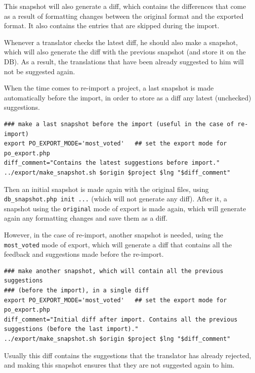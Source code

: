 \documentclass[11pt]{article}
\begin{document}
\begin{itemize}
     This snapshot will also generate a diff, which contains the
     differences that come as a result of formatting changes between the
     original format and the exported format. It also contains the
     entries that are skipped during the import.

     Whenever a translator checks the latest diff, he should also make a
     snapshot, which will also generate the diff with the previous
     snapshot (and store it on the DB). As a result, the translations
     that have been already suggested to him will not be suggested
     again.

     When the time comes to re-import a project, a last snapshot is made
     automatically before the import, in order to store as a diff any
     latest (unchecked) suggestions.

\begin{verbatim}
### make a last snapshot before the import (useful in the case of re-import)
export PO_EXPORT_MODE='most_voted'   ## set the export mode for po_export.php
diff_comment="Contains the latest suggestions before import."
../export/make_snapshot.sh $origin $project $lng "$diff_comment"
\end{verbatim}



     Then an initial snapshot is made again with the original files,
     using \texttt{db\_snapshot.php init ...} (which will not generate any
     diff).  After it, a snapshot using the \texttt{original} mode of export is
     made again, which will generate again any formatting changes and
     save them as a diff.

     However, in the case of re-import, another snapshot is needed,
     using the \texttt{most\_voted} mode of export, which will generate a diff
     that contains all the feedback and suggestions made before the
     re-import.

\begin{verbatim}
### make another snapshot, which will contain all the previous suggestions
### (before the import), in a single diff
export PO_EXPORT_MODE='most_voted'   ## set the export mode for po_export.php
diff_comment="Initial diff after import. Contains all the previous suggestions (before the last import)."
../export/make_snapshot.sh $origin $project $lng "$diff_comment"
\end{verbatim}


     Usually this diff contains the suggestions that the translator has
     already rejected, and making this snapshot ensures that they are
     not suggested again to him.


\end{itemize}
\end{document}
